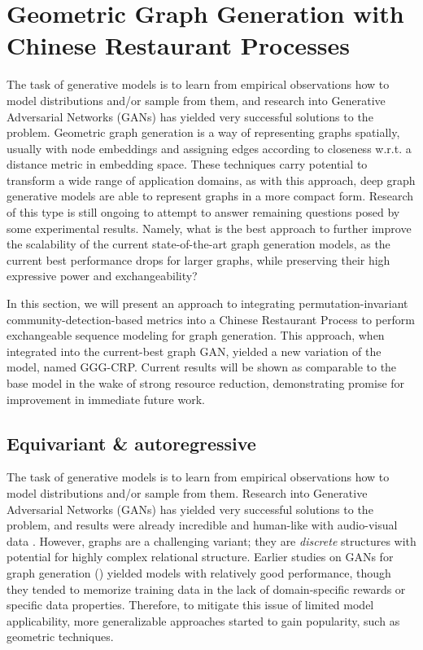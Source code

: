 \section{Geometric Graph Generation with Chinese Restaurant Processes}
\label{sec: gggcrp}

The task of generative models is to learn from empirical observations how to model distributions and/or sample from them, and research into Generative Adversarial Networks (GANs) has yielded very successful solutions to the problem. Geometric graph generation is a way of representing graphs spatially, usually with node embeddings and assigning edges according to closeness w.r.t. a distance metric in embedding space. These techniques carry potential to transform a wide range of application domains, as with this approach, deep graph generative models are able to represent graphs in a more compact form. Research of this type is still ongoing to attempt to answer remaining questions posed by some experimental results. Namely, what is the best approach to further improve the scalability of the current state-of-the-art graph generation models, as the current best performance drops for larger graphs, while preserving their high expressive power and exchangeability?

In this section, we will present an approach to integrating permutation-invariant community-detection-based metrics into a Chinese Restaurant Process to perform exchangeable sequence modeling for graph generation. This approach, when integrated into the current-best graph GAN, yielded a new variation of the model, named GGG-CRP. Current results will be shown as comparable to the base model in the wake of strong resource reduction, demonstrating promise for improvement in immediate future work.

\subsection{Equivariant \& autoregressive}

The task of generative models is to learn from empirical observations how to
model distributions and/or sample from them. Research into Generative Adversarial Networks (GANs) has yielded very successful solutions to the problem, and results were already incredible and human-like with audio-visual data \cite{karras_analyzing_2020}. However, graphs are a challenging variant; they are \emph{discrete} structures with potential for highly complex relational structure. 
Earlier studies on GANs for graph generation (\cite{bojchevski_netgan_2018, de_cao_molgan_2018}) yielded models with relatively good performance, though they tended to memorize training data in the lack of domain-specific rewards or specific data properties. Therefore, to mitigate this issue of limited model applicability, more generalizable approaches started to gain popularity, such as geometric techniques.

